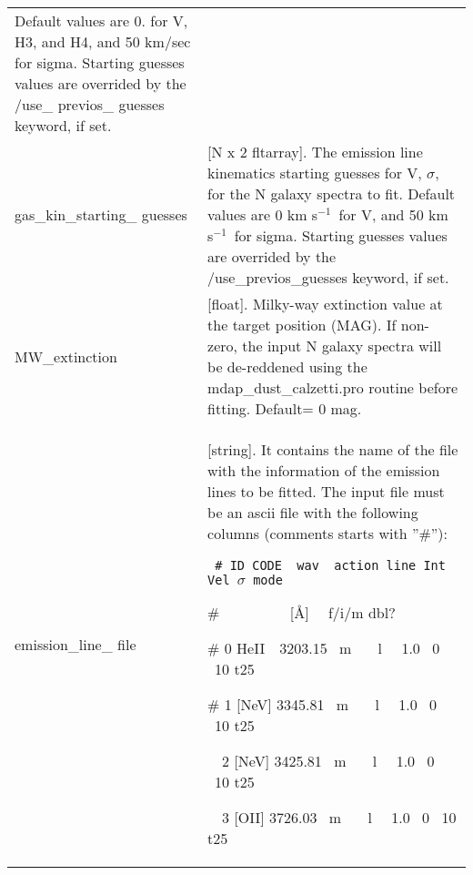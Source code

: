 \documentclass[11pt]{book}
\newcommand{\kms}{km s$^{-1}$}
\begin{document}
\begin{center}
\begin{longtable}{p{2.7cm}| p{11.1cm}}
                           Default values are 0. for V, H3, and H4, and 50 km/sec for sigma. 
                           Starting guesses values are overrided by
                           the /use\_ previos\_ guesses keyword, if set.\\
%
 gas\_kin\_starting\_ guesses & [N x 2 fltarray]. The emission line kinematics starting guesses for V, 
                           $\sigma$, for the N galaxy spectra to fit.
                           Default values are 0 \kms\ for V, and 50 \kms\ for sigma. 
                           Starting guesses values are overrided by
                           the /use\_previos\_guesses keyword, if set.\\
%
 MW\_extinction &  [float].  Milky-way extinction value at the target position (MAG). If non-zero,
                 the input N galaxy spectra will be de-reddened using the mdap\_dust\_calzetti.pro 
                 routine before fitting. Default= 0 mag.\\
 emission\_line\_ file &[string]. It contains the name of the file with the information of the
                    emission lines to be fitted. The input file must be an ascii file with the 
                    following columns (comments starts with ''\#''):
  
                    {\tt 
                    \#  ID  CODE \  wav  \ action  line    Int	Vel     $\sigma$ mode

                    \#  \ \ \ \ \ \ \  \ \ [\AA]  \ \ f/i/m   dbl?

                    \#   0   HeII\ \ 3203.15  \   m \ \ \ l   \  \ 1.0	\   0 \	10 	t25

                    \#   1   [NeV]  3345.81 \    m  \ \ \ l    \ \ 1.0  \   0 \   10      t25

                    \ \  2   [NeV]  3425.81  \   m  \ \ \ l   \ \ 1.0   \  0  \  10      t25

                    \ \  3   [OII]  3726.03   \ m  \ \ \ l   \ \  1.0 \	   0 \	10 	t25 }


\end{longtable}
\end{center}
\end{document}
